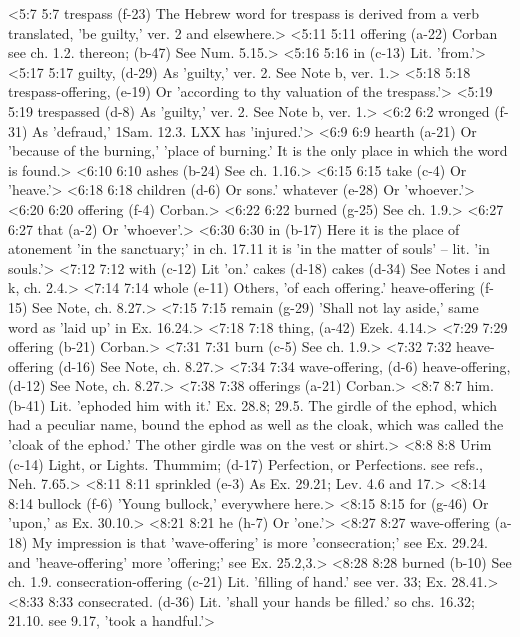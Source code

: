 <5:7 5:7  trespass (f-23)  The Hebrew word for trespass is derived from a verb  translated, 'be guilty,' ver. 2 and elsewhere.>
<5:11 5:11  offering (a-22)  Corban see ch. 1.2.
  thereon; (b-47)  See Num. 5.15.>
<5:16 5:16  in (c-13)  Lit. 'from.'>
<5:17 5:17  guilty, (d-29) As 'guilty,' ver. 2. See Note b, ver. 1.>
<5:18 5:18  trespass-offering, (e-19)  Or 'according to thy valuation of the trespass.'>
<5:19 5:19  trespassed (d-8)  As 'guilty,' ver. 2. See Note b, ver. 1.>
<6:2 6:2  wronged (f-31)  As 'defraud,' 1Sam. 12.3. LXX has 'injured.'>
<6:9 6:9  hearth (a-21)  Or 'because of the burning,' 'place of burning.' It is the  only place in which the word is found.>
<6:10 6:10  ashes (b-24)  See ch. 1.16.>
<6:15 6:15  take (c-4)  Or 'heave.'>
<6:18 6:18  children (d-6)  Or sons.'
  whatever (e-28)  Or 'whoever.'>
<6:20 6:20  offering (f-4)  Corban.>
<6:22 6:22  burned (g-25)  See ch. 1.9.>
<6:27 6:27  that (a-2)  Or 'whoever'.>
<6:30 6:30  in (b-17)  Here it is the place of atonement 'in the sanctuary;' in  ch. 17.11 it is 'in the matter of souls' -- lit. 'in souls.'>
<7:12 7:12  with (c-12)  Lit 'on.'
  cakes (d-18)  cakes (d-34)
  See Notes i and k, ch. 2.4.>
<7:14 7:14  whole (e-11)  Others, 'of each offering.'
  heave-offering (f-15)  See Note, ch. 8.27.>
<7:15 7:15  remain (g-29)  'Shall not lay aside,' same word as 'laid up' in Ex. 16.24.>
<7:18 7:18  thing, (a-42)  Ezek. 4.14.>
<7:29 7:29  offering (b-21)  Corban.>
<7:31 7:31  burn (c-5)  See ch. 1.9.>
<7:32 7:32  heave-offering (d-16) See Note, ch. 8.27.>
<7:34 7:34  wave-offering, (d-6)  heave-offering, (d-12)
  See Note, ch. 8.27.>
<7:38 7:38  offerings (a-21)  Corban.>
<8:7 8:7  him. (b-41)  Lit. 'ephoded him with it.' Ex. 28.8; 29.5. The girdle of the  ephod, which had a peculiar name, bound the ephod as well as  the cloak, which was called the 'cloak of the ephod.' The other  girdle was on the vest or shirt.>
<8:8 8:8  Urim (c-14)  Light, or Lights.
  Thummim; (d-17)  Perfection, or Perfections. see refs., Neh. 7.65.>
<8:11 8:11  sprinkled (e-3)  As Ex. 29.21; Lev. 4.6 and 17.>
<8:14 8:14  bullock (f-6)  'Young bullock,' everywhere here.>
<8:15 8:15  for (g-46)  Or 'upon,' as Ex. 30.10.>
<8:21 8:21  he (h-7)  Or 'one.'>
<8:27 8:27  wave-offering (a-18)  My impression is that 'wave-offering' is more 'consecration;'  see Ex. 29.24. and 'heave-offering' more 'offering;' see Ex. 25.2,3.>
<8:28 8:28  burned (b-10)  See ch. 1.9.
  consecration-offering (c-21)  Lit. 'filling of hand.' see ver. 33; Ex. 28.41.>
<8:33 8:33  consecrated. (d-36)  Lit. 'shall your hands be filled.' so chs. 16.32; 21.10. see  9.17, 'took a handful.'>
